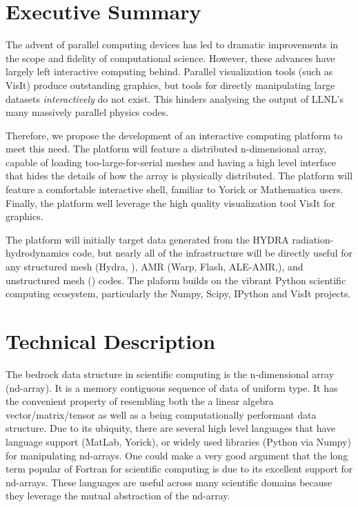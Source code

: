 \documentclass[a4paper]{article}
\begin{document}

\section*{Executive Summary }

The advent of parallel computing devices has led to dramatic improvements in the scope and fidelity of computational science.  However, these advances have largely left interactive computing behind.  Parallel visualization tools (such as VisIt) produce outstanding graphics, but tools for directly manipulating large datasets \emph{interactively} do not exist.  This hinders analysing the output of LLNL's many massively parallel physics codes.

Therefore, we propose the development of an interactive computing platform to meet this need.  The platform will feature a distributed n-dimensional array, capable of loading too-large-for-serial meshes and having a high level interface that hides the details of how the array is physically distributed.  The platform will feature a comfortable interactive shell, familiar to Yorick or Mathematica users.  Finally, the platform well leverage the high quality visualization tool VisIt for graphics.

The platform will initially target data generated from the HYDRA\cite{Marinak2001} radiation-hydrodynamics code, but nearly all of the infrastructure will be directly useful for any structured mesh (Hydra, ), AMR (Warp\cite{Grote2005}, Flash\cite{flash}, ALE-AMR\cite{Koniges2010},), and unstructured mesh () codes.  The plaform builds on the vibrant Python scientific computing ecosystem, particularly the Numpy\cite{Oliphant2006}, Scipy\cite{numpyscipy}, IPython\cite{ipython} and VisIt\cite{VisIt} projects.


\section*{Technical Description}

The bedrock data structure in scientific computing is the n-dimensional array (nd-array).  It is a memory contiguous sequence of data of uniform type.  It has the convenient property of resembling both the a linear algebra vector/matrix/tensor as well as a being computationally performant data structure.  Due to its ubiquity, there are several high level languages that have language support (MatLab\cite{matlab}, Yorick\cite{Munro1995}), or widely used libraries (Python\cite{CPython} via Numpy\cite{Oliphant2006}) for manipulating nd-arrays.  One could make a very good argument that the long term popular of Fortran for scientific computing is due to its excellent support for nd-arrays.  These languages are useful across many scientific domains because they leverage the mutual abstraction of the nd-array.
\end{document}
